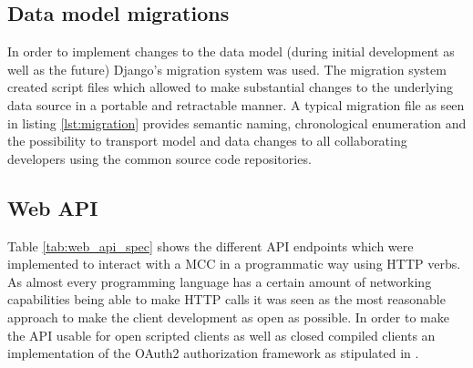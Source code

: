 \documentclass[BachelorPaper]{subfiles}
\begin{document}
\subsection{Data model migrations}
\label{subsec:methods_model_migrations}

In order to implement changes to the data model (during initial development as well as the future) Django's migration system was used. The migration system created script files which allowed to make substantial changes to the underlying data source in a portable and retractable manner. A typical migration file as seen in listing \ref{lst:migration} provides semantic naming, chronological enumeration and the possibility to transport model and data changes to all collaborating developers using the common source code repositories.\\



\subsection{Web API}
\label{subsec:methods_web_api}

Table \ref{tab:web_api_spec} shows the different \ac{API} endpoints which were implemented to interact with a \ac{MCC} in a programmatic way using \ac{HTTP} verbs. As almost every programming language has a certain amount of networking capabilities being able to make \ac{HTTP} calls it was seen as the most reasonable approach to make the client development as open as possible. In order to make the \ac{API} usable for open scripted clients as well as closed compiled clients an implementation of the OAuth2 authorization framework as stipulated in \cite{rfc6749}.\\
\end{document}
